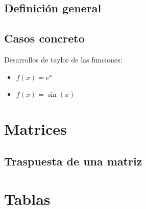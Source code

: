 \documentclass{article}
\begin{document}
\subsection{Definición general}


\subsection{Casos concreto}

Desarrollos de taylor de las funciones:

\begin{itemize}
\item $f(x)=e^x$


\item $f(x) = \sin (x)$


\end{itemize}

\section{Matrices}


\subsection{Traspuesta de una matriz}


\section{Tablas}

\end{document}
